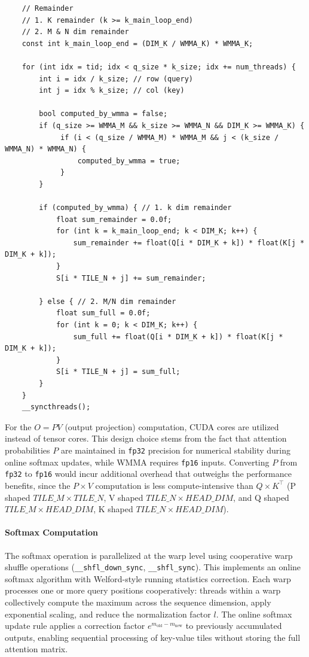 \documentclass[11pt]{article}
\begin{document}
\begin{lstlisting}     
    // Remainder
    // 1. K remainder (k >= k_main_loop_end)
    // 2. M & N dim remainder
    const int k_main_loop_end = (DIM_K / WMMA_K) * WMMA_K;

    for (int idx = tid; idx < q_size * k_size; idx += num_threads) {
        int i = idx / k_size; // row (query)
        int j = idx % k_size; // col (key)
        
        bool computed_by_wmma = false;
        if (q_size >= WMMA_M && k_size >= WMMA_N && DIM_K >= WMMA_K) {
             if (i < (q_size / WMMA_M) * WMMA_M && j < (k_size / WMMA_N) * WMMA_N) {
                 computed_by_wmma = true;
             }
        }

        if (computed_by_wmma) { // 1. k dim remainder
            float sum_remainder = 0.0f;
            for (int k = k_main_loop_end; k < DIM_K; k++) {
                sum_remainder += float(Q[i * DIM_K + k]) * float(K[j * DIM_K + k]);
            }
            S[i * TILE_N + j] += sum_remainder;

        } else { // 2. M/N dim remainder
            float sum_full = 0.0f;
            for (int k = 0; k < DIM_K; k++) {
                sum_full += float(Q[i * DIM_K + k]) * float(K[j * DIM_K + k]);
            }
            S[i * TILE_N + j] = sum_full;
        }
    }
    __syncthreads();
\end{lstlisting}


For the $O = P V$ (output projection) computation, CUDA cores are utilized instead of tensor cores. This design choice stems from the fact that attention probabilities $P$ are maintained in \texttt{fp32} precision for numerical stability during online softmax updates, while WMMA requires \texttt{fp16} inputs. Converting $P$ from \texttt{fp32} to \texttt{fp16} would incur additional overhead that outweighs the performance benefits, since the $P \times V$ computation is less compute-intensive than $Q \times K^{\top}$ (P shaped $TILE\_M \times TILE\_N$, V shaped $TILE\_N \times HEAD\_DIM$, and Q shaped $TILE\_M \times HEAD\_DIM$, K shaped $TILE\_N \times HEAD\_DIM$).


\paragraph{Softmax Computation}
The softmax operation is parallelized at the warp level using cooperative warp shuffle operations (\texttt{\_\_shfl\_down\_sync}, \texttt{\_\_shfl\_sync}). This implements an online softmax algorithm with Welford-style running statistics correction. Each warp processes one or more query positions cooperatively: threads within a warp collectively compute the maximum across the sequence dimension, apply exponential scaling, and reduce the normalization factor $l$. The online softmax update rule applies a correction factor $e^{m_{\text{old}} - m_{\text{new}}}$ to previously accumulated outputs, enabling sequential processing of key-value tiles without storing the full attention matrix.
\end{document}
